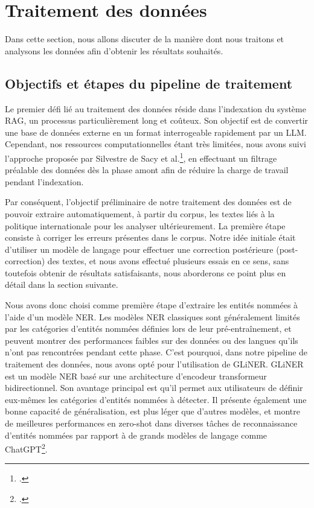 \documentclass[a4paper,twoside,12pt]{book}
\begin{document}
\section{Traitement des données}

Dans cette section, nous allons discuter de la manière dont nous traitons et analysons les données afin d'obtenir les résultats souhaités.

\subsection{Objectifs et étapes du pipeline de traitement}
Le premier défi lié au traitement des données réside dans l'indexation du système RAG, un processus particulièrement long et coûteux. Son objectif est de convertir une base de données externe en un format interrogeable rapidement par un LLM. Cependant, nos ressources computationnelles étant très limitées, nous avons suivi l'approche proposée par Silvestre de Sacy et al.\footcite{silvestredesacy2024}, en effectuant un filtrage préalable des données dès la phase amont afin de réduire la charge de travail pendant l'indexation.

Par conséquent, l'objectif préliminaire de notre traitement des données est de pouvoir extraire automatiquement, à partir du corpus, les textes liés à la politique internationale pour les analyser ultérieurement. La première étape consiste à corriger les erreurs présentes dans le corpus. Notre idée initiale était d'utiliser un modèle de langage pour effectuer une correction postérieure (post-correction) des textes, et nous avons effectué plusieurs essais en ce sens, sans toutefois obtenir de résultats satisfaisants, nous aborderons ce point plus en détail dans la section suivante.

Nous avons donc choisi comme première étape d'extraire les entités nommées à l'aide d'un modèle NER. Les modèles NER classiques sont généralement limités par les catégories d'entités nommées définies lors de leur pré-entraînement, et peuvent montrer des performances faibles sur des données ou des langues qu'ils n'ont pas rencontrées pendant cette phase. C'est pourquoi, dans notre pipeline de traitement des données, nous avons opté pour l'utilisation de GLiNER. GLiNER est un modèle NER basé sur une architecture d'encodeur transformeur bidirectionnel. Son avantage principal est qu'il permet aux utilisateurs de définir eux-mêmes les catégories d'entités nommées à détecter. Il présente également une bonne capacité de généralisation, est plus léger que d'autres modèles, et montre de meilleures performances en zero-shot dans diverses tâches de reconnaissance d'entités nommées par rapport à de grands modèles de langage comme ChatGPT\footcite{zaratiana2023}.
\end{document}
